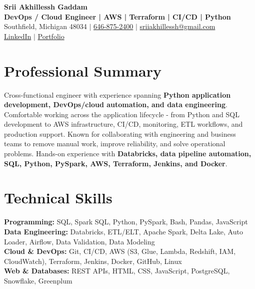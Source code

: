 \documentclass[letterpaper,10pt]{article}
\begin{document}
\fontsize{9.35pt}{10.45pt}\selectfont

\begin{center}
    {\LARGE \textbf{Srii Akhillessh Gaddam}} \\[-1pt]
    \textbf{DevOps / Cloud Engineer | AWS | Terraform | CI/CD | Python} \\[2pt]
    Southfield, Michigan 48034 $|$
    \href{tel:6468752400}{646-875-2400} $|$
    \href{mailto:sriiakhillessh@gmail.com}{sriiakhillessh@gmail.com} \\[1pt]
    \href{https://www.linkedin.com/in/srii-akhiilessh-gaddam-b48668191/}{LinkedIn} $|$
    \href{https://sriiakhillesshg.github.io/portfolio/}{Portfolio}
\end{center}
\vspace{-8pt}

\section{Professional Summary}
\small{Cross-functional engineer with experience spanning \textbf{Python application development, DevOps/cloud automation, and data engineering}. Comfortable working across the application lifecycle - from Python and SQL development to AWS infrastructure, CI/CD, monitoring, ETL workflows, and production support. Known for collaborating with engineering and business teams to remove manual work, improve reliability, and solve operational problems. Hands-on experience with \textbf{Databricks, data pipeline automation, SQL, Python, PySpark, AWS, Terraform, Jenkins, and Docker}.}

\section{Technical Skills}
\small{
\textbf{Programming:} SQL, Spark SQL, Python, PySpark, Bash, Pandas, JavaScript \\
\textbf{Data Engineering:} Databricks, ETL/ELT, Apache Spark, Delta Lake, Auto Loader, Airflow, Data Validation, Data Modeling \\
\textbf{Cloud \& DevOps:} Git, CI/CD, AWS (S3, Glue, Lambda, Redshift, IAM, CloudWatch), Terraform, Jenkins, Docker, GitHub, Linux \\
\textbf{Web \& Databases:} REST APIs, HTML, CSS, JavaScript, PostgreSQL, Snowflake, Greenplum
}
\end{document}
